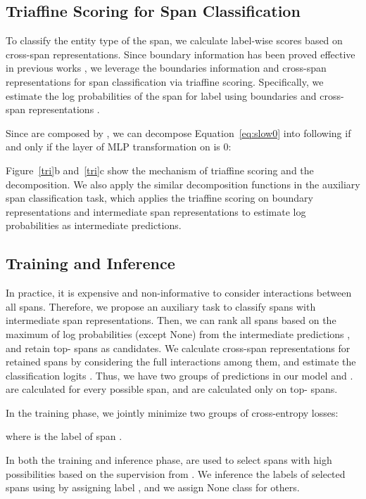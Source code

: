 \documentclass[11pt]{article}
\begin{document}
\subsection{Triaffine Scoring for Span Classification}
To classify the entity type of the span, we calculate label-wise scores based on cross-span representations.
Since boundary information has been proved effective in previous works \cite{yu2020named,fu2021nested}, 
we leverage the boundaries information and cross-span representations for span classification via triaffine scoring. 
Specifically, we estimate the log probabilities  of the span  for label  using boundaries  and cross-span representations .

Since  are composed by , we can decompose Equation~\ref{eq:slow0} into following if and only if the layer of MLP transformation on  is 0:

Figure~\ref{tri}b and~\ref{tri}c show the mechanism of triaffine scoring and the decomposition. We also apply the similar decomposition functions in the auxiliary span classification task, which applies the triaffine scoring on boundary representations and intermediate span representations  to estimate log probabilities  as intermediate predictions.




\subsection{Training and Inference}
\label{s3.6}
In practice, it is expensive and non-informative to consider interactions between all spans. Therefore, we propose an auxiliary task to classify spans with intermediate span representations.
Then, we can rank all spans based on the maximum of log probabilities (except None) from the intermediate predictions , and retain top- spans  as candidates.
We calculate cross-span representations  for retained spans by considering the full interactions among them, and estimate the classification logits .
Thus, we have two groups of predictions in our model  and .
 are calculated for every possible span, and  are calculated only on top- spans.

In the training phase, we jointly minimize two groups of cross-entropy losses:

where  is the label of span .

In both the training and inference phase,  are used to select spans with high possibilities based on the supervision from .
We inference the labels of selected spans using  by assigning label , and we assign None class for others.
\end{document}
